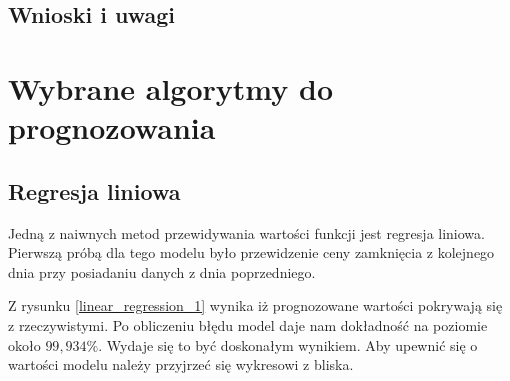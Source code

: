 \documentclass[a4paper, twoside, 11pt, openright]{article}
\begin{document}
\subsection{Wnioski i uwagi}

\newpage

\section{Wybrane algorytmy do prognozowania}

\subsection{Regresja liniowa}

Jedną z naiwnych metod przewidywania wartości funkcji jest regresja liniowa. Pierwszą próbą dla tego modelu było przewidzenie ceny zamknięcia z kolejnego dnia przy posiadaniu danych z dnia poprzedniego.

Z rysunku \ref{linear_regression_1} wynika iż prognozowane wartości pokrywają się z rzeczywistymi. Po obliczeniu błędu model daje nam dokładność na poziomie około  $99,934\%$. Wydaje się to być doskonałym wynikiem. Aby upewnić się o wartości modelu należy przyjrzeć się wykresowi z bliska.
\end{document}
